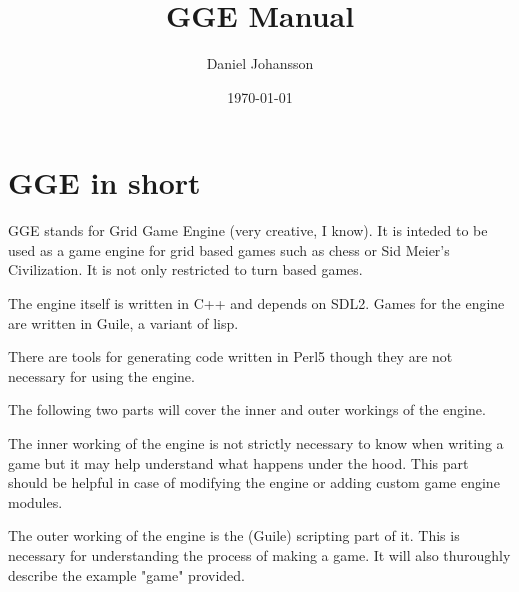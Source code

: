 \documentclass{article}
\title{GGE Manual}
\author{Daniel Johansson}
\date{\today}
\begin{document}
\maketitle
\tableofcontents
\part{GGE in short}
GGE stands for Grid Game Engine (very creative, I know). It is inteded to be used as a game engine for grid based games such as chess or Sid Meier's Civilization. It is not only restricted to turn based games.

The engine itself is written in C++ and depends on SDL2. Games for the engine are written in Guile, a variant of lisp.

There are tools for generating code written in Perl5 though they are not necessary for using the engine.

The following two parts will cover the inner and outer workings of the engine.

The inner working of the engine is not strictly necessary to know when writing a game but it may help understand what happens under the hood. 
This part should be helpful in case of modifying the engine or adding custom game engine modules.

The outer working of the engine is the (Guile) scripting part of it. This is necessary for understanding the process of making a game.
It will also thuroughly describe the example "game" provided.



\end{document}
